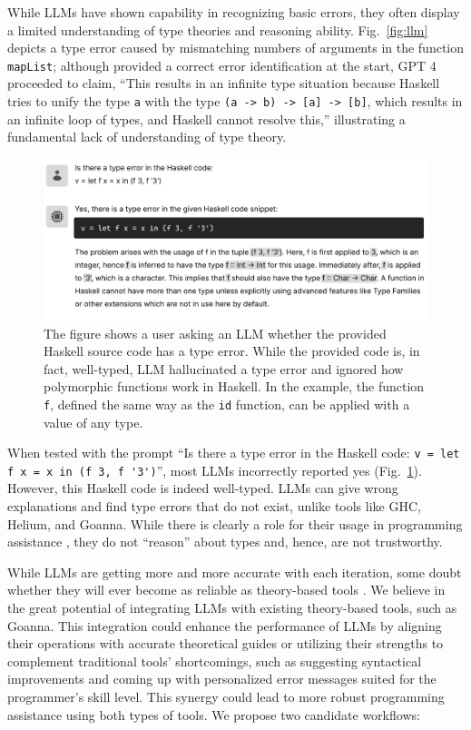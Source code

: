 \documentclass[pdflatex,lineno,sn-nature,Numbered]{sn-jnl}%
\begin{document}
While LLMs have shown capability in recognizing basic errors, they often display a limited understanding of type theories and reasoning ability. Fig.~\ref{fig:llm} depicts a type error caused by mismatching numbers of arguments in the function \texttt{mapList}; although provided a correct error identification at the start, GPT 4 proceeded to claim, “This results in an infinite type situation because Haskell tries to unify the type \texttt{a} with the type \texttt{(a -> b) -> [a] -> [b]}, which results in an infinite loop of types, and Haskell cannot resolve this,” illustrating a fundamental lack of understanding of type theory.

\begin{figure}[hbt]
  \includegraphics[width=\linewidth]{images/LLM2.pdf}
  \caption[An example where LLM identified a type error in well-typed source code]{\label{fig:llm2}
  The figure shows a user asking an LLM whether the provided Haskell source code has a type error. While the provided code is, in fact, well-typed, LLM hallucinated a type error and ignored how polymorphic functions work in Haskell. In the example, the function \texttt{f},  defined the same way as the \texttt{id} function, can be applied with a value of any type.
    } 
\end{figure}

When tested with the prompt ``Is there a type error in the Haskell code: 
\verb+v = let f x = x in (f 3, f '3')+'', most LLMs incorrectly reported yes (Fig.~\ref{fig:llm2}). However, this Haskell code is indeed well-typed. LLMs can give wrong explanations and find type errors that do not exist, unlike tools like GHC, Helium, and Goanna. While there is clearly a role for their usage in programming assistance \cite{Lee2024-hs}, they do not “reason” about types and, hence, are not trustworthy.

While LLMs are getting more and more accurate with each iteration, some doubt whether they will ever become as reliable as theory-based tools \cite{Berglund2023-ig}. We believe in the great potential of integrating LLMs with existing theory-based tools, such as Goanna. This integration could enhance the performance of LLMs by aligning their operations with accurate theoretical guides or utilizing their strengths to complement traditional tools' shortcomings, such as suggesting syntactical improvements and coming up with personalized error messages suited for the programmer's skill level. This synergy could lead to more robust programming assistance using both types of tools. We propose two candidate workflows:
\end{document}
